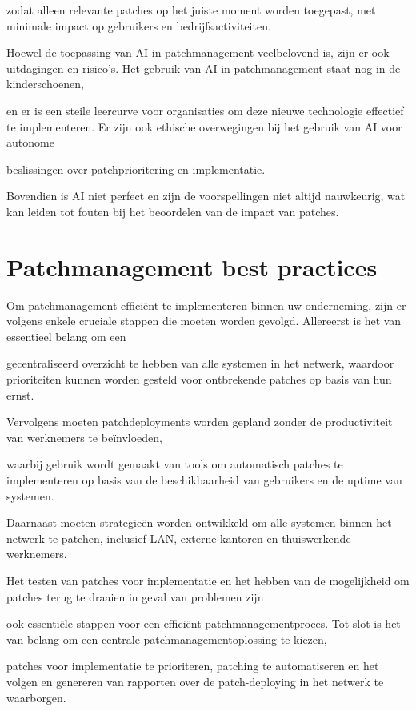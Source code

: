 zodat alleen relevante patches op het juiste moment worden toegepast, met minimale impact op gebruikers en bedrijfsactiviteiten.

Hoewel de toepassing van AI in patchmanagement veelbelovend is, zijn er ook uitdagingen en risico's. Het gebruik van AI in patchmanagement staat nog in de kinderschoenen, 

en er is een steile leercurve voor organisaties om deze nieuwe technologie effectief te implementeren. Er zijn ook ethische overwegingen bij het gebruik van AI voor autonome 

beslissingen over patchprioritering en implementatie. 

Bovendien is AI niet perfect en zijn de voorspellingen niet altijd nauwkeurig, wat kan leiden tot fouten bij het beoordelen van de impact van patches. \autocite{OFlaherty2023}

\section{Patchmanagement best practices}
Om patchmanagement efficiënt te implementeren binnen uw onderneming, zijn er volgens \textcite{ManageEngine2024} enkele cruciale stappen die moeten worden gevolgd. Allereerst is het van essentieel belang om een 

gecentraliseerd overzicht te hebben van alle systemen in het netwerk, waardoor prioriteiten kunnen worden gesteld voor ontbrekende patches op basis van hun ernst. 

Vervolgens moeten patchdeployments worden gepland zonder de productiviteit van werknemers te beïnvloeden, 

waarbij gebruik wordt gemaakt van tools om automatisch patches te implementeren op basis van de beschikbaarheid van gebruikers en de uptime van systemen.

Daarnaast moeten strategieën worden ontwikkeld om alle systemen binnen het netwerk te patchen, inclusief LAN, externe kantoren en thuiswerkende werknemers. 

Het testen van patches voor implementatie en het hebben van de mogelijkheid om patches terug te draaien in geval van problemen zijn

ook essentiële stappen voor een efficiënt patchmanagementproces. Tot slot is het van belang om een centrale patchmanagementoplossing te kiezen,

patches voor implementatie te prioriteren, patching te automatiseren en het volgen en genereren van rapporten over de patch-deploying in het netwerk te waarborgen.


